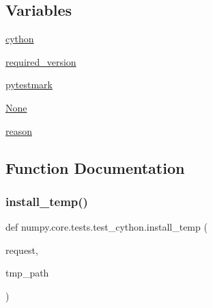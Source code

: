 \subsection*{Variables}
\begin{DoxyCompactItemize}
\item 
\hyperlink{namespacenumpy_1_1core_1_1tests_1_1test__cython_a48b98e1f9016b286184bf4ead429ba4c}{cython}
\item 
\hyperlink{namespacenumpy_1_1core_1_1tests_1_1test__cython_a7af87b5d9f0575c780ede93b08057c2c}{required\+\_\+version}
\item 
\hyperlink{namespacenumpy_1_1core_1_1tests_1_1test__cython_a5a7a2ac44a870fba265166aff710bfbf}{pytestmark}
\item 
\hyperlink{namespacenumpy_1_1core_1_1tests_1_1test__cython_ae86150bda5634b687770029c06272af0}{None}
\item 
\hyperlink{namespacenumpy_1_1core_1_1tests_1_1test__cython_ad9a1a16bab2dcc91524047d390d5ec87}{reason}
\end{DoxyCompactItemize}


\subsection{Function Documentation}
\mbox{\label{namespacenumpy_1_1core_1_1tests_1_1test__cython_a399872925418565eb54fefb7463e2b22}} 
\subsubsection{\texorpdfstring{install\+\_\+temp()}{install\_temp()}}
{\footnotesize\ttfamily def numpy.\+core.\+tests.\+test\+\_\+cython.\+install\+\_\+temp (\begin{DoxyParamCaption}\item[{}]{request,  }\item[{}]{tmp\+\_\+path }\end{DoxyParamCaption})}

\mbox{\label{namespacenumpy_1_1core_1_1tests_1_1test__cython_a30dd6b902ae9532b133308feb6c38aec}} 
